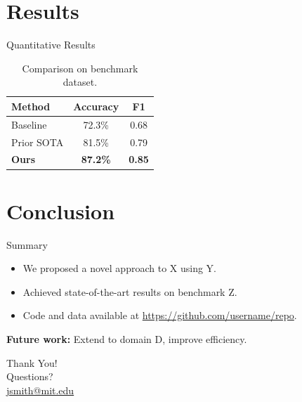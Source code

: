 \documentclass[aspectratio=169]{beamer}
\begin{document}
\section{Results}

\begin{frame}{Quantitative Results}
  \begin{table}
    \centering
    \begin{tabular}{lcc}
      \toprule
      \textbf{Method} & \textbf{Accuracy} & \textbf{F1} \\
      \midrule
      Baseline        & 72.3\%            & 0.68        \\
      Prior SOTA      & 81.5\%            & 0.79        \\
      \textbf{Ours}   & \textbf{87.2\%}   & \textbf{0.85} \\
      \bottomrule
    \end{tabular}
    \caption{Comparison on benchmark dataset.}
  \end{table}
\end{frame}

\section{Conclusion}

\begin{frame}{Summary}
  \begin{itemize}
    \item We proposed a novel approach to X using Y.
    \item Achieved state-of-the-art results on benchmark Z.
    \item Code and data available at \url{https://github.com/username/repo}.
  \end{itemize}

  \vspace{1em}
  \textbf{Future work:} Extend to domain D, improve efficiency.
\end{frame}

\begin{frame}[plain]
  \centering
  {\Huge Thank You!} \\[1em]
  {\large Questions?} \\[2em]
  \href{mailto:jsmith@mit.edu}{jsmith@mit.edu}
\end{frame}
\end{document}
